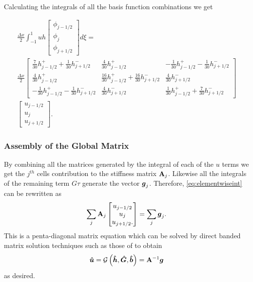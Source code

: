 Calculating the integrals of all the basis function combinations we get

\begin{multline}
\frac{\Delta x}{2}\int_{-1 }^{1}  uh \begin{bmatrix}
\phi_{j-1/2}\\\phi_j \\\phi_{j+1/2}
\end{bmatrix} d\xi =  \\  \frac{\Delta x}{2} \begin{bmatrix}
\frac{7}{30 } h^+_{j-1/2} + \frac{1}{30} h^-_{j+1/2} & \frac{4}{30 } h^+_{j-1/2}   & -\frac{1}{30 } h^+_{j-1/2} - \frac{1}{30} h^-_{j+1/2}\\\frac{4}{30 } h^+_{j-1/2} & \frac{16}{30 } h^+_{j-1/2} + \frac{16}{30} h^-_{j+1/2}&  \frac{4}{30} h^-_{j+1/2}\\ -\frac{1}{30 } h^+_{j-1/2} - \frac{1}{30} h^-_{j+1/2} &  \frac{4}{30 } h^-_{j+1/2} & \frac{1}{30 } h^+_{j-1/2} + \frac{7}{30} h^-_{j+1/2}
\end{bmatrix} \\  \begin{bmatrix}
u_{j-1/2}\\u_j \\u _{j+1/2}
\end{bmatrix}.
\end{multline}

\subsubsection{Assembly of the Global Matrix}
By combining all the matrices generated by the integral of each of the $u$ terms we get the $j^{th}$ cells contribution to the stiffness matrix $\mathbf{A}_j$. Likewise all the integrals of the remaining term $G\tau$ generate the vector $\boldsymbol{g}_{j}$. Therefore, \eqref{eq:elementwiseint} can be rewritten as
\begin{equation}
\label{eqn:FEMElemMatrixJ}
\sum_j \mathbf{A}_j \begin{bmatrix}
u_{j-1/2}\\u_j \\u _{j+1/2}.
\end{bmatrix} = \sum_j \boldsymbol{g}_j.
\end{equation}
This is a penta-diagonal matrix equation which can be solved by direct banded matrix solution techniques such as those of \citet{NumRecC-1996} to obtain
\begin{equation}
\boldsymbol{\hat{u}} =\mathcal{G}\left( \boldsymbol{\hat{h}}, \boldsymbol{\hat{G}},\boldsymbol{\hat{b}} \right) =   \mathbf{A}^{-1}\boldsymbol{g}
\label{eqn:usolvefromGhb}
\end{equation}
as desired.

